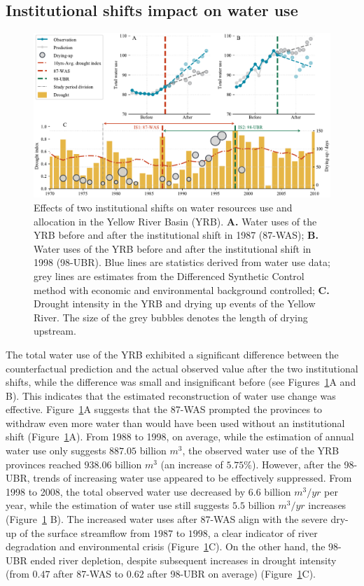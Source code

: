 \documentclass[preprint, 12pt]{elsarticle}
\begin{document}
\subsection{Institutional shifts impact on water use}\label{result-2}


\begin{figure}[!htb]
	\centering
	\includegraphics[width=0.9\linewidth]{outputs/main_results2.pdf}
	\caption{
	Effects of two institutional shifts on water resources use and allocation in the Yellow River Basin (YRB).
	\textbf{A.} Water uses of the YRB before and after the institutional shift in 1987 (87-WAS);
	\textbf{B.} Water uses of the YRB before and after the institutional shift in 1998 (98-UBR). Blue lines are statistics derived from water use data; grey lines are estimates from the Differenced Synthetic Control method with economic and environmental background controlled;
	\textbf{C.} Drought intensity in the YRB and drying up events of the Yellow River. The size of the grey bubbles denotes the length of drying upstream.
	}\label{fig:main_results}
\end{figure}

The total water use of the YRB exhibited a significant difference between the counterfactual prediction and the actual observed value after the two institutional shifts, while the difference was small and insignificant before (see Figures~\ref{fig:main_results}A and B). This indicates that the estimated reconstruction of water use change was effective.
Figure~\ref{fig:main_results}A suggests that the 87-WAS prompted the provinces to withdraw even more water than would have been used without an institutional shift (Figure~\ref{fig:main_results}A).
From 1988 to 1998, on average, while the estimation of annual water use only suggests $887.05$ billion $m^3$, the observed water use of the YRB provinces reached $938.06$ billion $m^3$ (an increase of $5.75\%$).
However, after the 98-UBR, trends of increasing water use appeared to be effectively suppressed.
From 1998 to 2008, the total observed water use decreased by $6.6$ billion $m^3/yr$ per year, while the estimation of water use still suggests $5.5$ billion $m^3/yr$ increases (Figure~\ref{fig:main_results} B).
The increased water uses after 87-WAS align with the severe dry-up of the surface streamflow from $1987$ to $1998$, a clear indicator of river degradation and environmental crisis (Figure~\ref{fig:main_results}C).
On the other hand, the 98-UBR ended river depletion, despite subsequent increases in drought intensity (from $0.47$ after 87-WAS to $0.62$ after 98-UBR on average) (Figure~\ref{fig:main_results}C).
\end{document}
